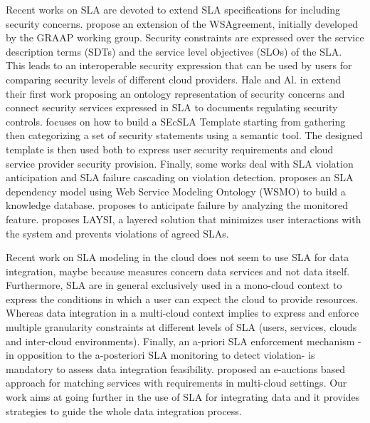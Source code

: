 
Recent  works on SLA are devoted to extend  SLA specifications for including  security concerns. 
\cite{6274042} propose an extension of the WSAgreement, initially developed by the GRAAP
working group. 
Security constraints are expressed over the service description
terms (SDTs) and the service level objectives (SLOs) of the SLA. 
This leads to an interoperable security expression that can be used by users for comparing security levels of different cloud  providers. Hale and Al. in \cite{6655684} extend their first work proposing an ontology representation of security concerns and connect security services expressed in SLA  to documents regulating security controls.
\cite{LunaGarcia:2012:BCS:2381913.2381932} focuses on how to build a SEcSLA Template starting from gathering then categorizing a set of security statements using a semantic tool. 
The designed template is then used both to express user security requirements and cloud service provider security provision.
Finally, some works  deal with SLA violation anticipation and SLA failure cascading on violation detection.  \cite{Dastjerdi:2012:DOA:2275356.2275360}  proposes an SLA dependency model using Web Service Modeling Ontology (WSMO) to build a knowledge database. \cite{5614035} proposes to anticipate failure by analyzing the monitored feature. 
\cite{5614035} proposes LAYSI, a layered solution that minimizes user interactions with the system and prevents violations of agreed SLAs.

 Recent work on SLA modeling in the cloud does not seem to use SLA for data integration, maybe because measures concern data services and not data itself.
Furthermore, SLA are in general exclusively used in a mono-cloud context to express the conditions in which a user can expect the cloud to provide resources. Whereas data integration in a multi-cloud context implies to express and enforce multiple granularity constraints at different levels of SLA (users, services, clouds and inter-cloud environments).  Finally,  an a-priori SLA enforcement mechanism -in opposition to the a-posteriori SLA monitoring to detect violation-  is mandatory to assess data integration feasibility. \cite{anisetti2014auctions} proposed an e-auctions based approach for matching services with requirements in multi-cloud settings. Our work aims at going further in the use of SLA for integrating data and it provides strategies to guide the whole data integration process.


